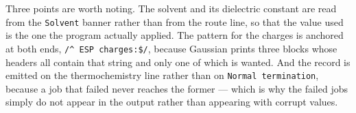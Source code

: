 \documentclass[10pt,a4paper]{article}
\begin{document}
Three points are worth noting. The solvent and its dielectric constant are read from
the \texttt{Solvent} banner rather than from the route line, so that the value used
is the one the program actually applied. The pattern for the charges is anchored at
both ends, \verb|/^ ESP charges:$/|, because Gaussian prints three blocks whose
headers all contain that string and only one of which is wanted. And the record is
emitted on the thermochemistry line rather than on \texttt{Normal termination},
because a job that failed never reaches the former --- which is why the failed jobs
simply do not appear in the output rather than appearing with corrupt values.
\end{document}
